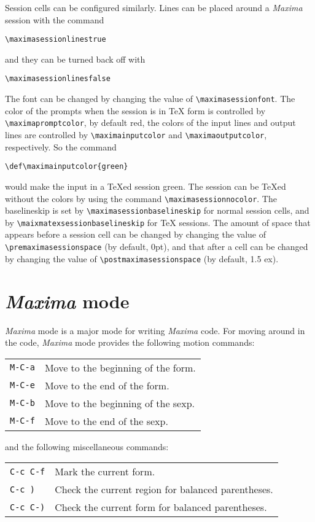 \documentclass{article}
\newcommand{\mx}{\textsl{\sffamily Maxima}}
\begin{document}
Session cells can be configured similarly.  
Lines can be placed around a \mx{} session with the command
\begin{verbatim}
\maximasessionlinestrue
\end{verbatim}
\noindent
and they can be turned back off with
\begin{verbatim}
\maximasessionlinesfalse
\end{verbatim}
\noindent
The font can be changed by changing the value of
\verb+\maximasessionfont+.  The color of the prompts when the session
is in \TeX{} form is controlled by \\
\verb+\maximapromptcolor+, by
default red, the colors of the input lines and output lines are
controlled by \verb+\maximainputcolor+ and \verb+\maximaoutputcolor+,
respectively. So the command
\begin{verbatim}
\def\maximainputcolor{green}
\end{verbatim}
\noindent
would make the input in a \TeX{}ed session green.  
The session can be \TeX{}ed without the colors by using the command
\verb+\maximasessionnocolor+.
The baselineskip is
set by \verb+\maximasessionbaselineskip+ for normal session cells, and
by \verb+\maixmatexsessionbaselineskip+ for \TeX{} sessions.  The
amount of space that appears before a session cell can be changed by
changing the value of \verb+\premaximasessionspace+ (by default, 0pt),
and that after a cell can be changed by changing the value of
\verb+\postmaximasessionspace+ (by default, 1.5 ex).

\section{\mx{} mode}

\noindent
\mx{} mode is a major mode for writing \mx{} code.
For moving around in the code, \mx{} mode provides the following
motion commands: 

\begin{tabular}{p{\firstcol}p{\secondcol}}
\texttt{M-C-a} & Move to the beginning of the form.\\
\texttt{M-C-e} & Move to the end of the form.\\
\texttt{M-C-b} & Move to the beginning of the sexp.\\
\texttt{M-C-f} & Move to the end of the sexp.
\end{tabular}

\noindent
and the following miscellaneous commands:

\begin{tabular}{p{\firstcol}p{\secondcol}}
\texttt{C-c C-f} & Mark the current form.\\
\texttt{C-c )} & Check the current region for balanced parentheses.\\
\texttt{C-c C-)} & Check the current form for balanced parentheses.
\end{tabular}
\end{document}
